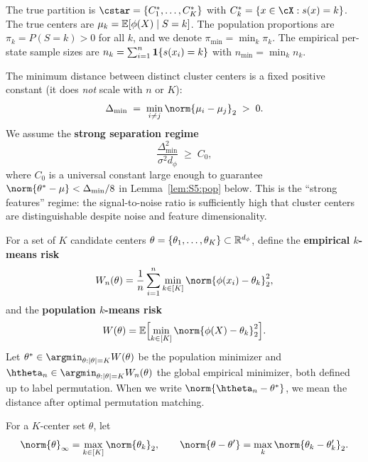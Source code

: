 \begin{assumption}
\label{ass:S5:cluster}
The true partition is $\cstar=\{C_1^*,\dots,C_K^*\}$ with
$C_k^*=\{x\in\cX: s(x)=k\}$.  The true centers are
$\mu_k=\mathbb{E}[\phi(X)\mid S=k]$.  The population proportions are
$\pi_k=P(S=k)>0$ for all $k$, and we denote
$\pi_{\min}=\min_k\pi_k$.  The empirical per-state sample sizes are
$n_k=\sum_{i=1}^n\mathbf{1}\{s(x_i)=k\}$ with $n_{\min}=\min_k n_k$.
\end{assumption}

\begin{assumption}
\label{ass:S5:sep}
The minimum distance between distinct cluster centers is a fixed positive
constant (it does \emph{not} scale with $n$ or $K$):
\[
\Delta_{\min} \;=\; \min_{i\neq j}\norm{\mu_i-\mu_j}_2 \;>\;0.
\]
We assume the \textbf{strong separation regime}
\begin{equation}
\frac{\Delta_{\min}^2}{\sigma^2 d_\phi}\;\ge\;C_0,
\label{eq:S5:strongsep}
\end{equation}
where $C_0$ is a universal constant large enough to guarantee
$\norm{\theta^*-\mu}<\Delta_{\min}/8$ in Lemma~\ref{lem:S5:pop} below.
This is the ``strong features'' regime: the signal-to-noise ratio is
sufficiently high that cluster centers are distinguishable despite noise
and feature dimensionality.
\end{assumption}

\begin{definition}
\label{def:S5:kmeans}
For a set of $K$ candidate centers
$\theta=\{\theta_1,\dots,\theta_K\}\subset\mathbb{R}^{d_\phi}$, define the
\textbf{empirical $k$-means risk}
\[
W_n(\theta)=\frac1n\sum_{i=1}^n\min_{k\in[K]}\norm{\phi(x_i)-\theta_k}_2^2,
\]
and the \textbf{population $k$-means risk}
\[
W(\theta)=\E\Bigl[\min_{k\in[K]}\norm{\phi(X)-\theta_k}_2^2\Bigr].
\]
Let
$\theta^*\in\argmin_{\theta:|\theta|=K}W(\theta)$ be the population
minimizer and $\htheta_n\in\argmin_{\theta:|\theta|=K}W_n(\theta)$ the
global empirical minimizer, both defined up to label permutation.
When we write $\norm{\htheta_n-\theta^*}$, we mean the distance after
optimal permutation matching.
\end{definition}

\begin{definition}
For a $K$-center set $\theta$, let
\[
\norm{\theta}_\infty = \max_{k\in[K]}\norm{\theta_k}_2,
\qquad
\norm{\theta-\theta'} = \max_{k}\norm{\theta_k-\theta'_k}_2.
\]
\end{definition}

